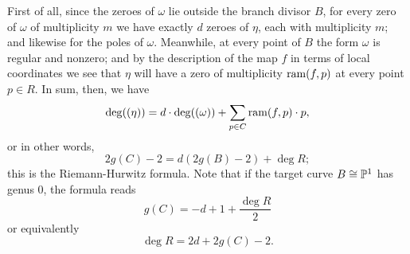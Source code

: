 \documentclass[12pt, leqno]{book}
\begin{document}
 First of all, since the zeroes of $\omega$ lie outside the branch divisor $B$, for every zero of $\omega$ of multiplicity $m$ we have exactly $d$ zeroes of $\eta$, each with multiplicity $m$; and likewise for the poles of $\omega$. Meanwhile, at every point of $B$ the form $\omega$ is regular and nonzero; and by the description of the map $f$ in terms of local coordinates we see that $\eta$ will have a zero of multiplicity $\ram(f,p)$ at every point $p \in R$. In sum, then, we have
 $$
 \deg((\eta)) = d\cdot \deg((\omega)) + \sum_{p \in C} \ram(f,p) \cdot p,
 $$
 or in other words,
 $$
 2g(C) - 2 = d(2g(B)-2) + \deg R;
  $$
  this is the Riemann-Hurwitz formula. Note that if the target curve $B \cong \PP^1$ has genus 0, the formula reads
  $$
  g(C) = -d  + 1+ \frac{\deg R}{2}
  $$
 or equivalently
 $$
 \deg R = 2d + 2g(C) - 2.
 $$
\end{document}
